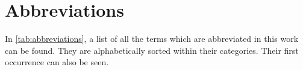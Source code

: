 \section{Abbreviations}
In \cref{tab:abbreviations},  a list of all the terms which are abbreviated in this work can be found. They are alphabetically sorted within their categories. Their first occurrence can also be seen.
